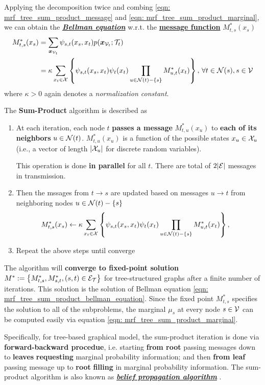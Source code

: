 \documentclass[11pt]{article}
\begin{document}
Applying the decomposition twice and combing \eqref{eqn: mrf_tree_sum_product_message} and \eqref{eqn: mrf_tree_sum_product_marginal}, we can obtain the \underline{\textbf{\emph{Bellman equation}}} w.r.t. the \underline{\textbf{message function}} $M_{t,s}^{*}(x_s)$
\begin{align}
M_{t,s}^{*}(x_s) &= \sum_{\boldsymbol{x}_{{\mathcal V}_t}}\psi_{s,t}(x_s, x_t)p(\boldsymbol{x}_{{\mathcal V}_t}; {\mathcal T}_{t}) \nonumber\\
&= \kappa \sum_{x_t \in {\mathcal X}}\left\{\psi_{s,t}(x_s, x_t)\psi_{t}(x_t)\prod_{u \in {\mathcal N}(t) - \left\{s\right\}}M_{u,t}^{*}(x_t)\right\}, \,  \forall t\in {\mathcal N}(s),  s \in {\mathcal V} \label{eqn: mrf_tree_sum_product_bellman_equation}
\end{align} where $\kappa > 0$ again denotes a \emph{normalization constant}. 


The \textbf{Sum-Product} algorithm is described as
\begin{enumerate}
\item At each iteration, each node $t$ \textbf{passes a message} $M_{t, u}^{*}(x_u)$ to \textbf{each of its neighbors} $u \in {\mathcal N}(t)$. $M_{t,u}^{*}(x_u)$ is  a function of the possible states $x_u \in  {\mathcal X}_u$ (i.e., a vector of length $|{\mathcal X}_u|$ for discrete random variables).

This operation is done \textbf{in parallel} for all $t$. There are total of $2|{\mathcal E}|$ messages in transmission.

\item Then the mssages from $t\rightarrow s$ are updated based on messages $u\rightarrow t$ from neighboring nodes $u \in {\mathcal N}(t) - \left\{s\right\}$
\begin{align*}
M_{t,s}^{*}(x_s) &\leftarrow \kappa \sum_{x_t \in {\mathcal X}}\left\{\psi_{s,t}(x_s, x_t)\psi_{t}(x_t)\prod_{u \in {\mathcal N}(t) - \left\{s\right\}}M_{u,t}^{*}(x_t)\right\},
\end{align*} 

\item Repeat the above steps until converge
\end{enumerate}
The algorithm will \textbf{converge to fixed-point solution} $M^{*} := \left\{M_{t,s}^{*}, M_{s, t}^{*}, (s,t)\in {\mathcal E}_{{\mathcal T}}\right\}$ for tree-structured graphs after a finite number of iterations. This solution is the solution of Bellman equation \eqref{eqn: mrf_tree_sum_product_bellman_equation}. Since the fixed point $M_{t,s}^{*}$ specifies the solution to all of the subproblems, the marginal $\mu_s$ at every node $s \in  {\mathcal V}$ can be computed easily via equation \eqref{eqn: mrf_tree_sum_product_marginal}.

Specifically, for tree-based graphical model, the sum-product iteration is done via \textbf{forward-backward procedue}, i.e. starting \textbf{from root} passing messages down to \textbf{leaves} \textbf{requesting} marginal probability information; and then  \textbf{from leaf} passing message up to \textbf{root} \textbf{filling} in marginal probability information. The sum-product algorithm is also known as \underline{\textbf{\emph{belief propagation algorithm}}} \citep{wainwright2008graphical}.
\end{document}
